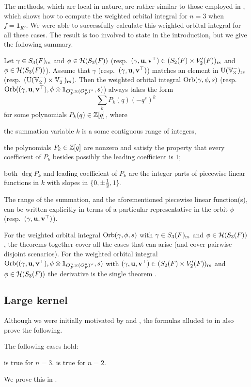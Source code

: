 The methods, which are local in nature,
are rather similar to those employed in \cite{ref:AFL},
which shows how to compute the weighted orbital integral for $n = 3$ when $f = \mathbf{1}_{K'}$.
We were able to successfully calculate this weighted orbital integral for all these cases.
The result is too involved to state in the introduction,
but we give the following summary.
\begin{theorem}
  \label{thm:summary}
  Let $\gamma \in S_3(F)_{\mathrm{rs}}$ and $\phi \in \mathcal H(S_3(F))$
  (resp.\ ${(\gamma, \mathbf u, \mathbf v^\top)} \in (S_2(F) \times V'_2(F))_{\mathrm{rs}}$ and $\phi \in \mathcal H(S_3(F))$).
  Assume that $\gamma$ (resp.\ ${(\gamma, \mathbf u, \mathbf v^\top)}$)
  matches an element in $\operatorname{U}(\mathbb V_3^-)_{\mathrm{rs}}$ (resp.\ $(\operatorname{U}(\mathbb V_2^-) \times \mathbb V_2^-)_{\mathrm{rs}}$).
  Then the weighted orbital integral $\operatorname{Orb}(\gamma, \phi, s)$
  (resp.\ $\operatorname{Orb}({(\gamma, \mathbf u, \mathbf v^\top)}, \phi \otimes \mathbf{1}_{O_F^n \times (O_F^n)^\vee}, s)$) always takes the form
  \[ \sum_k P_k(q) (-q^s)^k \]
  for some polynomials $P_k(q) \in \mathbb Z[q]$, where
  \begin{itemize}
    \ii the summation variable $k$ is a some contiguous range of integers,

    \ii the polynomials $P_k \in \mathbb Z[q]$ are nonzero and satisfy the property
    that every coefficient of $P_k$ besides possibly the leading coefficient is $1$;

    \ii both $\deg P_k$ and leading coefficient of $P_k$ are the integer parts
    of piecewise linear functions in $k$ with slopes in $\{0, \pm\frac{1}{2}, 1\}$.
  \end{itemize}
  The range of the summation, and the aforementioned piecewise linear function(s),
  can be written explicitly in terms of a particular representative
  in the orbit $\phi$ (resp.\ ${(\gamma, \mathbf u, \mathbf v^\top)}$).
\end{theorem}
For the weighted orbital integral $\operatorname{Orb}(\gamma, \phi, s)$
with $\gamma \in S_3(F)_{\mathrm{rs}}$ and $\phi \in \mathcal H(S_3(F))$,
the theorems 
together cover all the cases that can arise (and cover pairwise disjoint scenarios).
For the weighted orbital integral $\operatorname{Orb}({(\gamma, \mathbf u, \mathbf v^\top)}, \phi \otimes \mathbf{1}_{O_F^n \times (O_F^n)^\vee}, s)$
with ${(\gamma, \mathbf u, \mathbf v^\top)} \in (S_2(F) \times V'_2(F))_{\mathrm{rs}}$ and $\phi \in \mathcal H(S_3(F))$
the derivative is the single theorem .

\subsection{Large kernel}
Although we were initially motivated by
 and ,
the formulas alluded to in  also prove the following.
\begin{theorem}
  \label{thm:large_kernel}
  The following cases hold:
  \begin{itemize}
    \ii {} is true for $n = 3$.
    \ii {} is true for $n = 2$.
  \end{itemize}
\end{theorem}
We prove this in .

